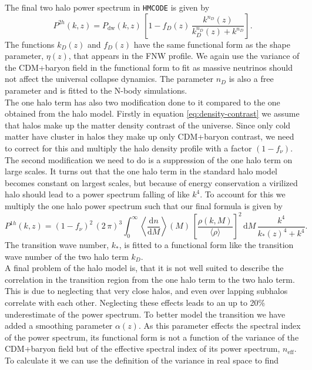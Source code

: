 \documentclass[oneside]{book}
\newcommand*{\rd}{\mathrm{d}}
\newcommand*{\hmcode}{\texttt{HMCODE}\xspace}
\begin{document}
The final two halo power spectrum in \hmcode is given by \begin{equation}
    P^{2h}(k,z) = P_\mathrm{dw}(k,z)\,\left[1-f_D(z)\,\frac{k^{n_D}(z)}{k_D^{n_D}(z)+k^{n_D}}\right].
\end{equation}
The functions $k_D(z)$ and $f_D(z)$ have the same functional form as the shape parameter, $\eta(z)$, that appears in the FNW profile. We again use the variance of the CDM+baryon field in the functional form to fit as massive neutrinos should not affect the universal collapse dynamics. The parameter $n_D$ is also a free parameter and is fitted to the N-body simulations.\\
The one halo term has also two modification done to it compared to the one obtained from the halo model. Firstly in equation \ref{eq:density-contrast} we assume that halos make up the matter density contrast of the universe. Since only cold matter have cluster in halos they make up only CDM+baryon contrast, we need to correct for this and multiply the halo density profile with a factor $(1-f_\nu)$.\\
The second modification we need to do is a suppression of the one halo term on large scales. It turns out that the one halo term in the standard halo model becomes constant on largest scales, but because of energy conservation a virilized halo should lead to a power spectrum falling of like $k^4$. To account for this we multiply the one halo power spectrum such that our final formula is given by
\begin{equation}
    P^{1h}(k,z) = (1-f_\nu)^2\,(2\,\pi)^3\int_0^\infty \left\langle\frac{\rd n}{\rd M}\right\rangle\!\!(M)\,\left[\frac{\rho(k,M)}{\langle \rho \rangle}\right]^2 \,\rd M\,\frac{k^4}{k_*(z)^4+k^4}.
\end{equation}
The transition wave number, $k_*$, is fitted to a functional form like the transition wave number of the two halo term $k_D$.\\
A final problem of the halo model is, that it is not well suited to describe the correlation in the transition region from the one halo term to the two halo term. This is due to neglecting that very close halos, and even over lapping subhalos correlate with each other. Neglecting these effects leads to an up to 20\% underestimate of the power spectrum. To better model the transition we have added a smoothing parameter $\alpha(z)$. As this parameter effects the spectral index of the power spectrum, its functional form is not a function of the variance of the CDM+baryon field but of the effective spectral index of its power spectrum, $n_\mathrm{eff}$. To calculate it we can use the definition of the variance in real space to find 
\end{document}
